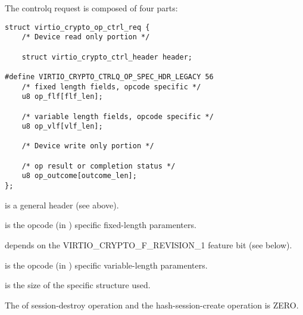 The controlq request is composed of four parts:
\begin{lstlisting}
struct virtio_crypto_op_ctrl_req {
    /* Device read only portion */

    struct virtio_crypto_ctrl_header header;

#define VIRTIO_CRYPTO_CTRLQ_OP_SPEC_HDR_LEGACY 56
    /* fixed length fields, opcode specific */
    u8 op_flf[flf_len];

    /* variable length fields, opcode specific */
    u8 op_vlf[vlf_len];

    /* Device write only portion */

    /* op result or completion status */
    u8 op_outcome[outcome_len];
};
\end{lstlisting}

 is a general header (see above).

 is the opcode (in ) specific fixed-length paramenters.

 depends on the VIRTIO_CRYPTO_F_REVISION_1 feature bit (see below).

 is the opcode (in ) specific variable-length paramenters.

 is the size of the specific structure used.
\begin{note}
The  of session-destroy operation and the hash-session-create
operation is ZERO.
\end{note}

